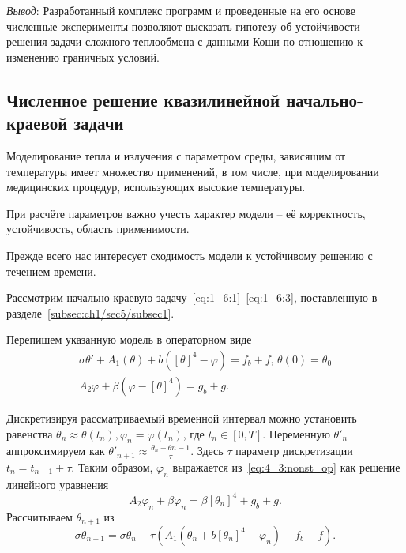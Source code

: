 \textit{Вывод}: Разработанный комплекс программ и проведенные на его
основе численные эксперименты позволяют высказать
гипотезу об устойчивости решения задачи сложного теплообмена
с данными Коши по отношению к изменению граничных условий.

%

\subsection{Численное решение квазилинейной начально-краевой задачи}
\label{subsec:ch4/sec3/quasilinear}
Моделирование тепла и излучения с параметром среды, зависящим от температуры
имеет множество применений, в том числе, при моделировании медицинских процедур,
использующих высокие температуры.

При расчёте параметров важно учесть характер модели -- её корректность, устойчивость,
область применимости.

Прежде всего нас интересует сходимость модели к устойчивому решению с течением времени.

Рассмотрим начально-краевую задачу~\eqref{eq:1_6:1}--\eqref{eq:1_6:3},
поставленную в разделе~\ref{subsec:ch1/sec5/subsec1}.

Перепишем указанную модель в операторном виде
\begin{equation}
    \label{eq:4_3:nonst_op}
    \begin{gathered}
        \sigma \theta' + A_1(\theta) + b([\theta]^4 - \varphi) = f_b + f, \, \theta(0) = \theta_0 \\
        A_2\varphi + \beta(\varphi - [\theta]^4) = g_b + g.
    \end{gathered}
\end{equation}

Дискретизируя рассматриваемый временной интервал можно установить равенства
$\theta_n \approx \theta(t_n), \varphi_n = \varphi(t_n)$, где $t_n \in [0, T]$.
Переменную $\theta'_n$ аппроксимируем как $\theta'_{n+1} \approx \frac{\theta_{n} - \theta{n-1}}{\tau}$.
Здесь $\tau$ параметр дискретизации $t_n = t_{n-1} + \tau$.
Таким образом, $\varphi_n$ выражается из~\eqref{eq:4_3:nonst_op} как решение линейного уравнения
\[
    A_2 \varphi_n + \beta \varphi_n = \beta [\theta_n]^4 + g_b + g.
\]
Рассчитываем $\theta_{n+1}$ из
\begin{equation}
    \label{eq:4_3:theta_progress}
    \sigma \theta_{n+1} = \sigma \theta_n - \tau (A_1(\theta_n + b[\theta_n]^4 - \varphi_n) - f_b -f).
\end{equation}

